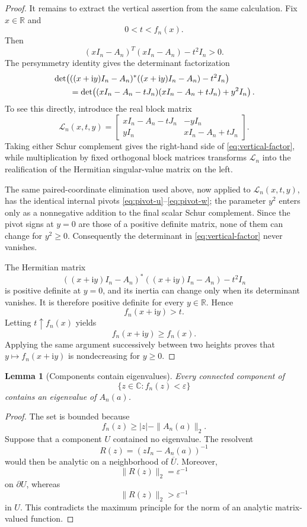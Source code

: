 \documentclass[11pt]{article}
\newtheorem{lemma}[theorem]{Lemma}
\begin{document}
\begin{proof}
It remains to extract the vertical assertion from the same calculation. Fix \(x\in\mathbb R\) and
\[
0<t<f_n(x).
\]
Then
\[
(xI_n-A_n)^T(xI_n-A_n)-t^2I_n>0.
\]
The persymmetry identity gives the determinant factorization
\begin{align}
&\det\!\left(
((x+\mathrm i y)I_n-A_n)^*
((x+\mathrm i y)I_n-A_n)-t^2I_n
\right) \notag\\
&\qquad =
\det\!\left(
(xI_n-A_n-tJ_n)(xI_n-A_n+tJ_n)+y^2I_n
\right). \label{eq:vertical-factor}
\end{align}
To see this directly, introduce the real block matrix
\[
\mathcal L_n(x,t,y)
=
\begin{bmatrix}
xI_n-A_n-tJ_n&-yI_n\\
yI_n&xI_n-A_n+tJ_n
\end{bmatrix}.
\]
Taking either Schur complement gives the right-hand side of
\eqref{eq:vertical-factor}, while multiplication by fixed orthogonal
block matrices transforms \(\mathcal L_n\) into the realification of
the Hermitian singular-value matrix on the left.

The same paired-coordinate elimination used above, now applied to
\(\mathcal L_n(x,t,y)\), has the identical internal pivots
\eqref{eq:pivot-u}--\eqref{eq:pivot-w}; the parameter \(y^2\) enters
only as a nonnegative addition to the final scalar Schur complement.
Since the pivot signs at \(y=0\) are those of a positive definite
matrix, none of them can change for \(y^2\ge0\). Consequently the
determinant in \eqref{eq:vertical-factor} never vanishes.

The Hermitian matrix
\[
((x+\mathrm i y)I_n-A_n)^*
((x+\mathrm i y)I_n-A_n)-t^2I_n
\]
is positive definite at \(y=0\), and its inertia can change only when
its determinant vanishes. It is therefore positive definite for every
\(y\in\mathbb R\). Hence
\[
f_n(x+\mathrm i y)>t.
\]
Letting \(t\uparrow f_n(x)\) yields
\[
f_n(x+\mathrm i y)\ge f_n(x).
\]
Applying the same argument successively between two heights proves
that \(y\mapsto f_n(x+\mathrm i y)\) is nondecreasing for \(y\ge0\).
\end{proof}

\begin{lemma}[Components contain eigenvalues]\label{lem:components}
Every connected component of
\[
\{z\in\mathbb C:f_n(z)<\varepsilon\}
\]
contains an eigenvalue of \(A_n(a)\).
\end{lemma}

\begin{proof}
The set is bounded because
\[
f_n(z)\ge |z|-\|A_n(a)\|_2.
\]
Suppose that a component \(U\) contained no eigenvalue. The resolvent
\[
R(z)=(zI_n-A_n(a))^{-1}
\]
would then be analytic on a neighborhood of \(\overline U\). Moreover,
\[
\|R(z)\|_2=\varepsilon^{-1}
\]
on \(\partial U\), whereas
\[
\|R(z)\|_2>\varepsilon^{-1}
\]
in \(U\). This contradicts the maximum principle for the norm of an
analytic matrix-valued function.
\end{proof}
\end{document}
